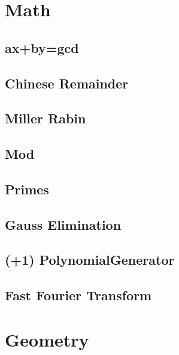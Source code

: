 \documentclass[10pt,twocolumn,oneside]{article}
\begin{document}
\newpage

\section{Math}
\subsection{ax+by=gcd}


\subsection{Chinese Remainder}


\subsection{Miller Rabin}


\subsection{Mod}


\subsection{Primes}


\subsection{Gauss Elimination}


\subsection{(+1) PolynomialGenerator}


\subsection{Fast Fourier Transform}


\section{Geometry}
\end{document}
